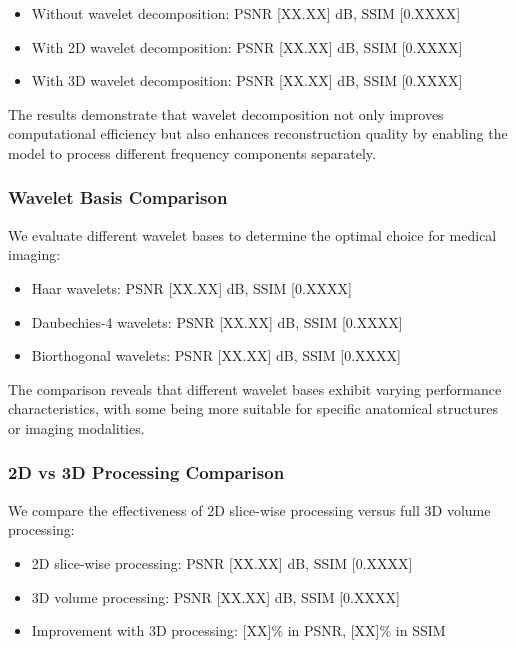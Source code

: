 \documentclass{midl} %
\begin{document}
\begin{itemize}
\item Without wavelet decomposition: PSNR [XX.XX] dB, SSIM [0.XXXX]
\item With 2D wavelet decomposition: PSNR [XX.XX] dB, SSIM [0.XXXX]
\item With 3D wavelet decomposition: PSNR [XX.XX] dB, SSIM [0.XXXX]
\end{itemize}

The results demonstrate that wavelet decomposition not only improves computational efficiency but also enhances reconstruction quality by enabling the model to process different frequency components separately.

\subsubsection{Wavelet Basis Comparison}

We evaluate different wavelet bases to determine the optimal choice for medical imaging:

\begin{itemize}
\item Haar wavelets: PSNR [XX.XX] dB, SSIM [0.XXXX]
\item Daubechies-4 wavelets: PSNR [XX.XX] dB, SSIM [0.XXXX]
\item Biorthogonal wavelets: PSNR [XX.XX] dB, SSIM [0.XXXX]
\end{itemize}

The comparison reveals that different wavelet bases exhibit varying performance characteristics, with some being more suitable for specific anatomical structures or imaging modalities.

\subsubsection{2D vs 3D Processing Comparison}

We compare the effectiveness of 2D slice-wise processing versus full 3D volume processing:

\begin{itemize}
\item 2D slice-wise processing: PSNR [XX.XX] dB, SSIM [0.XXXX]
\item 3D volume processing: PSNR [XX.XX] dB, SSIM [0.XXXX]
\item Improvement with 3D processing: [XX]\% in PSNR, [XX]\% in SSIM
\end{itemize}
\end{document}
